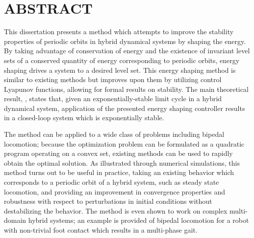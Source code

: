 %
%
%

\chapter*{ABSTRACT}

\pagestyle{plain} %
\setcounter{page}{2}

\indent This dissertation presents a method which attempts to improve the
stability properties of periodic orbits in hybrid dynamical systems by shaping
the energy.
%
By taking advantage of conservation of energy and the existence of invariant
level sets of a conserved quantity of energy corresponding to periodic orbits,
energy shaping drives a system to a desired level set.
%
This energy shaping method is similar to existing methods but improves upon them
by utilizing control Lyapunov functions, allowing for formal results on
stability.
%
The main theoretical result, , states that, given
an exponentially-stable limit cycle in a hybrid dynamical system, application of
the presented energy shaping controller results in a closed-loop system which is
exponentially stable.

The method can be applied to a wide class of problems including bipedal
locomotion;
%
because the optimization problem can be formulated as a quadratic program
operating on a convex set, existing methods can be used to rapidly obtain
the optimal solution.
%
As illustrated through numerical simulations, this method turns out to be useful
in practice, taking an existing behavior which corresponds to a periodic orbit
of a hybrid system, such as steady state locomotion, and providing an
improvement in convergence properties and robustness with respect to
perturbations in initial conditions without destabilizing the behavior.
%
The method is even shown to work on complex multi-domain hybrid systems;
%
an example is provided of bipedal locomotion for a robot with non-trivial foot
contact which results in a multi-phase gait.

\pagebreak{}
